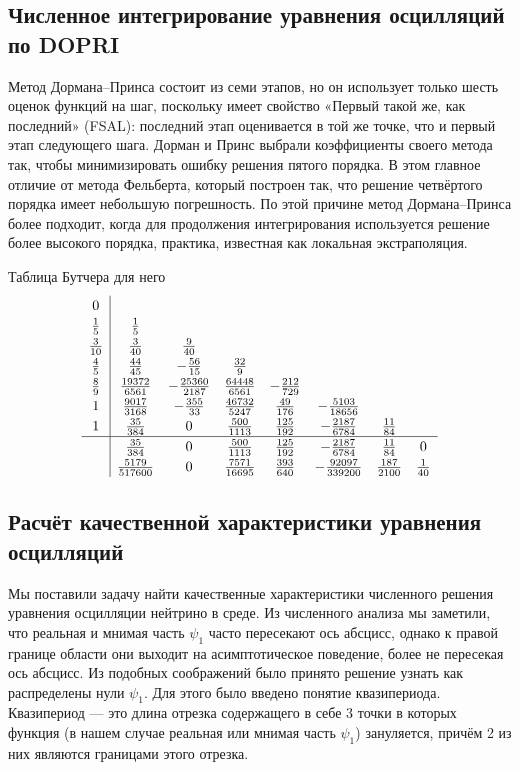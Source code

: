 \documentclass[a4paper,12pt]{article}
\begin{document}
	\subsection{Численное интегрирование уравнения осцилляций по DOPRI}

	Метод Дормана--Принса состоит из семи этапов, но он использует только шесть оценок функций на шаг, поскольку имеет свойство «Первый такой же, как последний» (FSAL): последний этап оценивается в той же точке, что и первый этап следующего шага. Дорман и Принс выбрали коэффициенты своего метода так, чтобы минимизировать ошибку решения пятого порядка. В этом главное отличие от метода Фельберта, который построен так, что решение четвёртого порядка имеет небольшую погрешность. По этой причине метод Дормана--Принса более подходит, когда для продолжения интегрирования используется решение более высокого порядка, практика, известная как локальная экстраполяция.

	Таблица Бутчера для него
	 \[
	 \renewcommand\arraystretch{1.2}
	 \begin{array}
	 	{c|ccccccc}
	 	0\\
	 	\frac{1}{5} & \frac{1}{5}\\
	 	\frac{3}{10} &\frac{3}{40} &\frac{9}{40} \\
		\frac{4}{5} &\frac{44}{45} &-\frac{56}{15} &\frac{32}{9} \\
		\frac{8}{9} &\frac{19372}{6561} &-\frac{25360}{2187} &\frac{64448}{6561} &-\frac{212}{729} \\
		1&\frac{9017}{3168} &-\frac{355}{33} &\frac{46732}{5247} &\frac{49}{176} &-\frac{5103}{18656} \\
	 	1&\frac{35}{384} &0 &\frac{500}{1113} &\frac{125}{192} &-\frac{2187}{6784}&\frac{11}{84} \\
	 	\hline
		&\frac{35}{384} &0 &\frac{500}{1113} &\frac{125}{192} &-\frac{2187}{6784}&\frac{11}{84}&0 \\
	 	& \frac{5179}{517600} &0 &\frac{7571}{16695} &\frac{393}{640} &-\frac{92097}{339200} &\frac{187}{2100} &\frac{1}{40}
	 \end{array}
	 \]

	\subsection{Расчёт качественной характеристики уравнения осцилляций}

	Мы поставили задачу найти качественные характеристики численного решения уравнения осцилляции нейтрино в среде. Из численного анализа мы заметили, что реальная и мнимая часть \(\psi_1\) часто пересекают ось абсцисс, однако к правой границе области они выходит на асимптотическое поведение, более не пересекая ось абсцисс. Из подобных соображений было принято решение узнать как распределены нули \(\psi_{1}\). Для этого было введено понятие квазипериода. Квазипериод --- это длина отрезка содержащего в себе 3 точки в которых функция  (в нашем случае реальная или мнимая часть \(\psi_1\)) зануляется, причём 2 из них являются границами этого отрезка.
\end{document}
